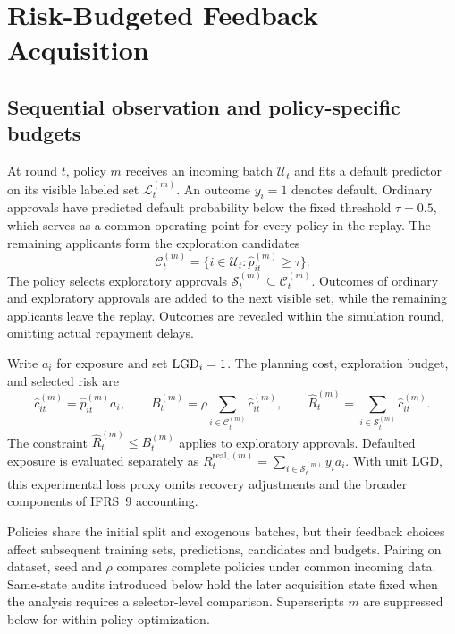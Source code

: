 \section{Risk-Budgeted Feedback Acquisition}
\label{sec:problem}\label{sec:method}

\subsection{Sequential observation and policy-specific budgets}
At round $t$, policy $m$ receives an incoming batch $\mathcal U_t$ and fits a default predictor on its visible labeled set $\mathcal L_t^{(m)}$. An outcome $y_i=1$ denotes default. Ordinary approvals have predicted default probability below the fixed threshold $\tau=0.5$, which serves as a common operating point for every policy in the replay. The remaining applicants form the exploration candidates
\begin{equation}
\mathcal C_t^{(m)}=\{i\in\mathcal U_t:\widehat p_{it}^{(m)}\ge\tau\}.
\end{equation}
The policy selects exploratory approvals $\mathcal S_t^{(m)}\subseteq\mathcal C_t^{(m)}$. Outcomes of ordinary and exploratory approvals are added to the next visible set, while the remaining applicants leave the replay. Outcomes are revealed within the simulation round, omitting actual repayment delays.

Write $a_i$ for exposure and set $\mathrm{LGD}_i=1$. The planning cost, exploration budget, and selected risk are
\begin{equation}
\widehat c_{it}^{(m)}=\widehat p_{it}^{(m)}a_i,\qquad
B_t^{(m)}=\rho\sum_{i\in\mathcal C_t^{(m)}}\widehat c_{it}^{(m)},\qquad
\widehat R_t^{(m)}=\sum_{i\in\mathcal S_t^{(m)}}\widehat c_{it}^{(m)}.
\label{eq:budget}
\end{equation}
The constraint $\widehat R_t^{(m)}\le B_t^{(m)}$ applies to exploratory approvals. Defaulted exposure is evaluated separately as $R_t^{\mathrm{real},(m)}=\sum_{i\in\mathcal S_t^{(m)}}y_i a_i$. With unit LGD, this experimental loss proxy omits recovery adjustments and the broader components of IFRS~9 accounting.

Policies share the initial split and exogenous batches, but their feedback choices affect subsequent training sets, predictions, candidates and budgets. Pairing on dataset, seed and $\rho$ compares complete policies under common incoming data. Same-state audits introduced below hold the later acquisition state fixed when the analysis requires a selector-level comparison. Superscripts $m$ are suppressed below for within-policy optimization.

